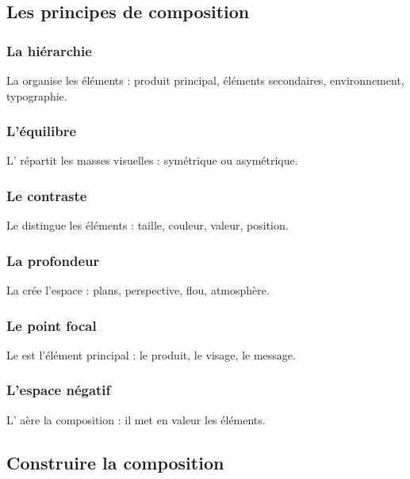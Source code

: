 \subsection{Les principes de composition}

\subsubsection{La hiérarchie}

La  organise les éléments : produit principal, éléments secondaires, environnement, typographie.

\subsubsection{L'équilibre}

L' répartit les masses visuelles : symétrique ou asymétrique.

\subsubsection{Le contraste}

Le  distingue les éléments : taille, couleur, valeur, position.

\subsubsection{La profondeur}

La  crée l'espace : plans, perspective, flou, atmosphère.

\subsubsection{Le point focal}

Le  est l'élément principal : le produit, le visage, le message.

\subsubsection{L'espace négatif}

L' aère la composition : il met en valeur les éléments.

\subsection{Construire la composition}

